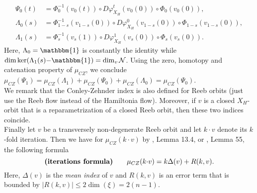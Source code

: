 \documentclass[a4paper,12pt,bibliography=totocnumbered,titlepage=false,abstracton,bookmarksnumbered=true]{scrartcl}
\theoremstyle{definition}
\begin{document}
\begin{align*}
 \Psi_0(t)&=\Phi_0^{-1}(v_0(t))\circ D\varphi^t_{X_H}(v_0(0))\circ\Phi_0(v_0(0)),\\
 \Lambda_0(s)&=\Phi^{-1}_{1-s}(v_{1-s}(0))\circ D\varphi^0_{X_H}(v_{1-s}(0))\circ\Phi_{1-s}(v_{1-s}(0)),\\
 \Lambda_1(s)&=\Phi^{-1}_s(v_s(1))\circ D\varphi^1_{X_H}(v_s(0))\circ\Phi_s(v_s(0)).
\end{align*}
Here, $\Lambda_0=\mathbbm{1}$ is constantly the identity while $\dim\ker(\Lambda_1(s){-}\mathbbm{1})=\dim_v\mathcal{N}$. Using the zero, homotopy and catenation property of $\mu_{CZ}$, we conclude $\mu_{CZ}(\Psi_1)=\mu_{CZ}(\Lambda_1)+\mu_{CZ}(\Psi_0)+\mu_{CZ}(\Lambda_0)=\mu_{CZ}(\Psi_0)$.\pagebreak\\
We remark that the Conley-Zehnder index is also defined for Reeb orbits (just use the Reeb flow instead of the Hamiltonia flow). Moreover, if $v$ is a closed $X_H$-orbit that is a reparametrization of a closed Reeb orbit, then these two indices coincide.\\
Finally let $v$ be a transversely non-degenerate Reeb orbit and let $k{\cdot} v$ denote its $k$-fold iteration. Then we have for $\mu_{CZ}(k{\cdot} v)$ by \cite{SaZeh}, Lemma 13.4, or \cite{FauckThesis}, Lemma 55, the following formula
\begin{equation}\label{eqIteration}
 \text{\textbf{(iterations formula)}}\qquad \mu_{CZ}(k{\cdot} v) = k \Delta (v)+ R(k,v).
\end{equation}
Here, $\Delta(v)$ is the \textit{mean index} of $v$ and $R(k,v)$ is an error term that is bounded by $|R(k,v)|\leq 2\dim(\xi)=2(n{-}1)$.
\end{document}
